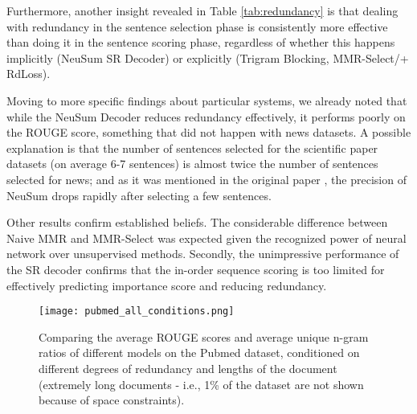 \documentclass[11pt,a4paper]{article}
\begin{document}
Furthermore, another insight revealed in Table \ref{tab:redundancy} is that dealing with redundancy in the sentence selection phase is consistently more effective than doing it in the sentence scoring phase, regardless of whether this happens implicitly (NeuSum  SR Decoder) or explicitly (Trigram Blocking, MMR-Select/+  RdLoss).

Moving to more specific findings about particular systems, we already noted that while the NeuSum Decoder reduces redundancy effectively, it performs poorly on the ROUGE score, something that did not happen with news datasets. A possible explanation is that 
the number of sentences selected for the scientific paper datasets (on average 6-7 sentences) is almost twice the number of sentences selected for news;  and as it was mentioned in the original paper \cite{NeuSum}, the precision of NeuSum drops rapidly after selecting a few sentences.


Other results confirm established beliefs. The considerable difference between Naive MMR and MMR-Select was expected given the recognized power of neural network over unsupervised methods. Secondly, the unimpressive performance of the SR decoder confirms that the in-order sequence scoring is too limited for effectively predicting importance score and reducing redundancy. 



\begin{figure*}[h!]
    \centering
\texttt{[image: pubmed\_all\_conditions.png]}
    \caption{Comparing the average ROUGE scores and average unique n-gram ratios of different models on the Pubmed dataset, conditioned on different degrees of redundancy and lengths of the document (extremely long documents - i.e., 1\% of the dataset are not shown because of space constraints).\footnotemark}
    \label{fig:diff_conditions}
\end{figure*}
\vspace{-1mm}
\end{document}
